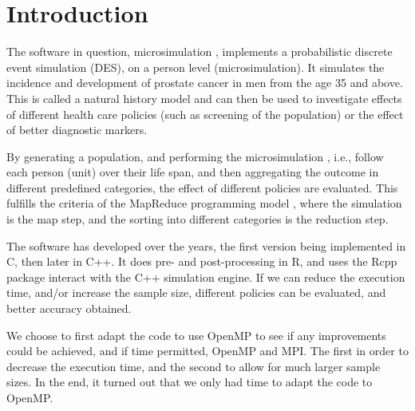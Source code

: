 \section{Introduction}

The software in question, microsimulation \cite{microsimulation},
implements a probabilistic discrete event simulation (DES), on a
person level (microsimulation). It simulates the incidence and development of prostate cancer
in men from the age 35 and above. This is called a natural history
model and can then be used to investigate effects of different health
care policies (such as screening of the population) or the effect of
better diagnostic markers.

By generating a population, and performing the microsimulation \citep{gulati_calibrating_2010},
i.e., follow each person (unit) over their life span, and then
aggregating the outcome in different predefined categories, the effect of
different policies are evaluated. This fulfills the criteria of the
MapReduce programming model \cite{MapReduce:2004}, where the
simulation is the map step, and the sorting into different categories
is the reduction step.

The software has developed over the years, the first version being
implemented in C, then later in C++. It does pre- and post-processing
in R, and uses the Rcpp \citep{rcpp} package interact with the C++
simulation engine. If we can reduce the execution time, and/or
increase the sample size, different policies can be evaluated, and
better accuracy obtained.

We choose to first adapt the code to use OpenMP to see if any
improvements could be achieved, and if time permitted, OpenMP and
MPI. The first in order to decrease the execution time, and the second
to allow for much larger sample sizes. In the end, it turned out that
we only had time to adapt the code to OpenMP.







